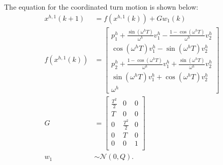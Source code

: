 \documentclass[letterpaper, 10 pt, conference]{ieeeconf}
\begin{document}
	The equation for the coordinated turn motion is shown below:
	\small\begin{subequations}
		\begin{align*}
			x^{h,1}(k+1)&= f(x^{h,1}(k))+Gw_1(k) \\ 
			f(x^{h,1}(k))&=\left[
			\begin{array}{c}
				p^h_1+\frac{\sin(\omega^h T)}{\omega^h}v^h_1-\frac{1-\cos(\omega^h T)}{\omega^h}v^h_2\\
				\cos(\omega^h T)v^h_1-\sin(\omega^h T)v^h_2\\
				p^h_2+\frac{1-\cos(\omega^h T)}{\omega^h}v^h_1+\frac{\sin(\omega^h T)}{\omega^h}v^h_2\\
				\sin(\omega^h T)v^h_1+\cos(\omega^h T)v^h_2\\
				\omega^h 
			\end{array}\right] \\
			G &= \left[
			\begin{array}{ccc}
				\frac{T^2}{2}& 0& 0\\
				T& 0& 0\\
				0& \frac{T^2}{2}& 0\\
				0& T& 0\\
				0& 0& 1\\                
			\end{array}\right] \\
			w_1&\sim\mathcal{N}(0,Q).
		\end{align*}
	\end{subequations}\normalsize
	
\end{document}
